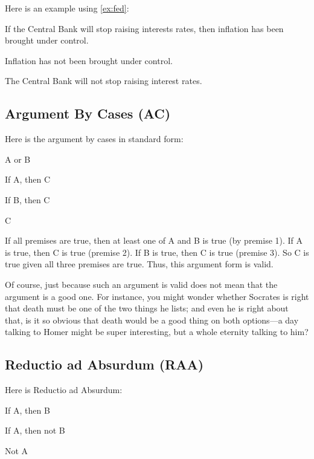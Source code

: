 Here is an example using \ref{ex:fed}:

\begin{argumentNamed*}[Argument 2]

 \aitem If the Central Bank will stop raising interests rates, then inflation 
 has been brought under control.
 
 \aitem Inflation has not been brought under control.

\aitem The Central Bank will not stop raising interest rates.  

\end{argumentNamed*}

\subsection{Argument By Cases (AC)}

Here is the argument by cases in standard form:

\begin{argument*}

 \aitem A or B
 
 \aitem If A, then C

 \aitem If B, then C

 \aitem C

\end{argument*}

If all premises are true, then at least one of A and B is true (by premise 1).  
If A is true, then C is true (premise 2). If B is true, then C is true (premise 
3). So C is true given all three premises are true. Thus, this argument form is 
valid. 

Of course, just because such an argument is valid does not mean that the 
argument is a good one. For instance, you might wonder whether Socrates is right 
that death must be one of the two things he lists; and even he is right about 
that, is it so obvious that death would be a good thing on both options---a day 
talking to Homer might be super interesting, but a whole eternity talking to him? 

\subsection{Reductio ad Absurdum (RAA)}

Here is Reductio ad Absurdum:

\begin{argument*}

 \aitem If A, then B 

 \aitem If A, then not B 

 \aitem Not A

\end{argument*}

